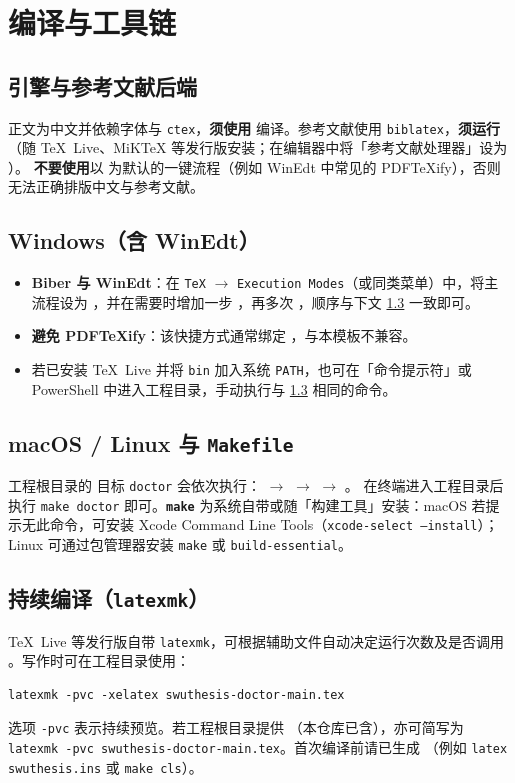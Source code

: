 \section{编译与工具链}\label{sec:doctor-compile}
\subsection{引擎与参考文献后端}
正文为中文并依赖字体与 \texttt{ctex}，\textbf{须使用 } 编译。参考文献使用 \texttt{biblatex}，\textbf{须运行 }（随 TeX~Live、MiKTeX 等发行版安装；在编辑器中将「参考文献处理器」设为 ）。
\textbf{不要使用}以  为默认的一键流程（例如 WinEdt 中常见的 PDF\TeX{}ify），否则无法正确排版中文与参考文献。

\subsection{Windows（含 WinEdt）}
\begin{itemize}
  \item \textbf{Biber 与 WinEdt}：在 \texttt{TeX} $\rightarrow$ \texttt{Execution Modes}（或同类菜单）中，将主流程设为 \textbf{}，并在需要时增加一步 ，再多次 ，顺序与下文 \cref{sec:doctor-compile-make} 一致即可。
  \item \textbf{避免 PDF\TeX{}ify}：该快捷方式通常绑定 ，与本模板不兼容。
  \item 若已安装 TeX~Live 并将 \texttt{bin} 加入系统 \texttt{PATH}，也可在「命令提示符」或 PowerShell 中进入工程目录，手动执行与 \cref{sec:doctor-compile-make} 相同的命令。
\end{itemize}

\subsection{macOS / Linux 与 \texttt{Makefile}}\label{sec:doctor-compile-make}
工程根目录的  目标 \texttt{doctor} 会依次执行：
 $\rightarrow$  $\rightarrow$  $\rightarrow$ 。
在终端进入工程目录后执行 \texttt{make doctor} 即可。\textbf{\texttt{make}} 为系统自带或随「构建工具」安装：macOS 若提示无此命令，可安装 Xcode Command Line Tools（\texttt{xcode-select --install}）；Linux 可通过包管理器安装 \texttt{make} 或 \texttt{build-essential}。

\subsection{持续编译（\texttt{latexmk}）}
TeX~Live 等发行版自带 \texttt{latexmk}，可根据辅助文件自动决定运行次数及是否调用 。写作时可在工程目录使用：
\begin{verbatim}
latexmk -pvc -xelatex swuthesis-doctor-main.tex
\end{verbatim}
选项 \texttt{-pvc} 表示持续预览。若工程根目录提供 （本仓库已含），亦可简写为 \texttt{latexmk -pvc swuthesis-doctor-main.tex}。首次编译前请已生成 （例如 \texttt{latex swuthesis.ins} 或 \texttt{make cls}）。

